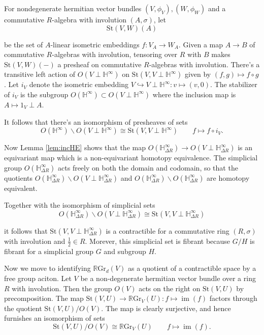 \documentclass[draftthesis,tocnosub,noragright,centerchapter,10pt]{uiucthesis2009}
\newcommand{\mbb}{\mathbb}
\newcommand{\RGr}{\mathbb R\mathrm{Gr}}
\newcommand{\St}{\mathrm{St}}
\DeclareMathOperator*{\im}{im}
\theoremstyle{plain}
\theoremstyle{definition}
\begin{document}
For nondegenerate hermitian vector bundles $(V,\phi_V), (W,\phi_W)$ and a commutative
$R$-algebra with involution $(A,\sigma)$, let
\[
\St(V,W)(A)
\]

be the set of $A$-linear isometric embeddings $f : V_A \rightarrow
W_A$. Given a map $A \rightarrow B$ of commutative $R$-algebras with involution, tensoring over $R$ with $B$ makes
$\St(V,W)(-)$ a presheaf on commutative $R$-algebras with involution. There's a
transitive left action of $O(V \perp \mbb H^\infty)$ on $\St(V,V \perp \mbb
H^\infty)$ given by $(f,g) \mapsto f \circ g$. Let $i_V$ denote the
isometric embedding $V \hookrightarrow V \perp \mbb H^\infty : v
\mapsto (v,0)$. The stabilizer of $i_V$ is the subgroup $O(\mbb
H^\infty) \subset O(V \perp \mbb H^\infty)$ where the inclusion map is
$A \mapsto 1_V \perp A$.

It follows that there's an isomorphism of presheaves of sets 
\[
O(\mbb H^\infty)\backslash O(V \perp \mbb  H^\infty) \cong
\St(V,V\perp \mbb H^\infty) \qquad f \mapsto f \circ i_V.
\]

Now Lemma \ref{lem:incHE} shows that the map $O(\mbb H^\infty_{\Delta
  R}) \rightarrow O(V \perp \mbb H^\infty_{\Delta R})$ is an
equivariant map which is a non-equivariant homotopy equivalence. The
simplicial group $O(\mbb H^\infty_{\Delta R})$ acts freely on both the
domain and codomain, so that the quotients $O(\mbb H^\infty_{\Delta
  R})\backslash O(V \perp \mbb H^\infty_{\Delta R})$ and $O(\mbb H^\infty_{\Delta
  R})\backslash O(\mbb H^\infty_{\Delta R})$ are homotopy equivalent.

Together with the isomorphism of simplicial sets
\[
O(\mbb H^\infty_{\Delta
  R})\backslash O(V \perp \mbb H^\infty_{\Delta R}) \cong \St(V,V
\perp \mbb H^\infty_{\Delta R})
\]

it follows that $\St(V,V\perp \mbb H^\infty_{\Delta R})$ is a
contractible for a commutative ring $(R,\sigma)$ with involution and
$\frac{1}{2} \in R$. Morever, this simplicial set is fibrant because
$G/H$ is fibrant for a simplicial group $G$ and subgroup $H$.

Now we move to identifying $\RGr_d(V)$ as a quotient of a contractible
space by a free group aciton. Let $V$ be a non-degenerate hermitian
vector bundle over a ring $R$ with involution. Then the group $O(V)$
acts on the right on $\St(V,U)$ by precomposition. The map $\St(V,U)
\rightarrow \RGr_V(U) : f \mapsto \im(f)$ factors through the quotient
$\St(V,U)/O(V)$. The map is clearly surjective, and hence furnishes an
isomorphism of sets
\[
\St(V,U)/O(V) \cong \RGr_V(U) \qquad f \mapsto \im(f).
\]
\end{document}
